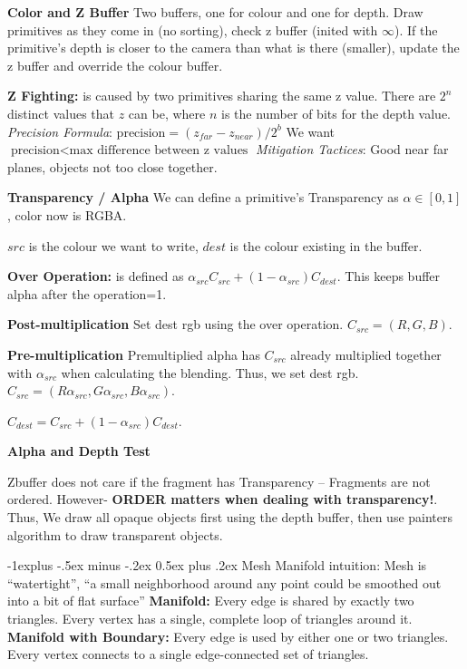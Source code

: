 \documentclass[letterpaper, 8pt]{extarticle}
\makeatletter
\renewcommand{\section}{\@startsection{section}{1}{0mm}%
                                {-1explus -.5ex minus -.2ex}%
                                {0.5ex plus .2ex}%
                                {\normalfont\small\bfseries}}
\makeatother
\begin{document}
\begin{multicols*}{4}
\textbf{Color and Z Buffer} Two buffers, one for colour and one for depth. 
Draw primitives as they come in (no sorting), 
check z buffer (inited with $\infty$). 
If the primitive's depth is closer to the camera than what is there (smaller), update the z buffer and override the colour buffer.

\textbf{Z Fighting:} is caused by two primitives sharing the same z value. There are $2^n$ distinct values that $z$ can be, where $n$ is the number of bits for the depth value.
\textit{Precision Formula}:
\(
\text{precision} = (z_{far} - z_{near}) / 2^b
\)
We want \(\text{precision} < \text{max difference between z values}\)
\textit{Mitigation Tactices}: Good near far planes, objects not too close together.


\textbf{Transparency / Alpha}
We can define a primitive's Transparency as $\alpha \in [0, 1]$, color now is RGBA.

$src$ is the colour we want to write, $dest$ is the colour existing in the buffer.

\textbf{Over Operation:} is defined as $\alpha_{src}C_{src} + (1-\alpha_{src})C_{dest}$.
This keeps buffer alpha after the operation=1.

\textbf{Post-multiplication}
Set dest rgb using the over operation. $C_{src} = (R,G,B)$.

\textbf{Pre-multiplication}
Premultiplied alpha has $C_{src}$ already multiplied together with $\alpha_{src}$ when calculating the blending.
Thus, we set dest rgb. $C_{src} = (R\alpha_{src},G\alpha_{src},B\alpha_{src})$.

$C_{dest} = C_{src} + (1-\alpha_{src})C_{dest}$.

\textbf{Alpha and Depth Test}

Zbuffer does not care if the fragment has Transparency -- Fragments are not ordered. However- \textbf{ORDER matters when dealing with transparency!}. 
Thus, We draw all opaque objects first using the depth buffer, then use painters algorithm to draw transparent objects.

\section{Mesh}
Manifold intuition:
Mesh is ``watertight'',
``a small neighborhood around any point could be smoothed out into a bit of flat surface''
\textbf{Manifold:} Every edge is shared by exactly two triangles. Every vertex has a single, complete loop of triangles around it.
\textbf{Manifold with Boundary:} Every edge is used by either one or two triangles. Every vertex connects to a single edge-connected set of triangles.


\end{multicols*}
\end{document}
